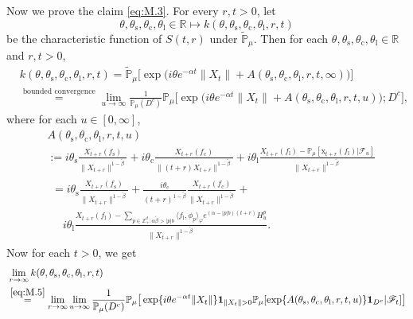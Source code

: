 \documentclass{amse-new}
\numberwithin{equation}{section}
\begin{document}
\begin{prof}
	Now we prove the claim \eqref{eq:M.3}.
	For every $r,t >0$, let
\[
	\theta,\theta_\mathrm s,\theta_\mathrm c,\theta_\mathrm l \in \mathbb R
	\mapsto k(\theta,\theta_\mathrm s,\theta_\mathrm c,\theta_\mathrm l,r,t)
\]
	be the characteristic function of  $S(t,r)$ under $\widetilde{\mathbb P}_{\mu}$.
	Then for each $\theta,\theta_\mathrm s,\theta_\mathrm c,\theta_\mathrm l\in \mathbb R$ and $r,t> 0$,
\begin{align}
	&k(\theta,\theta_\mathrm s,\theta_\mathrm c,\theta_\mathrm l,r,t)
	=\widetilde{\mathbb P}_{\mu}\big[\exp\big( i\theta e^{-\alpha t}\|X_t\|+A(\theta_\mathrm s,\theta_\mathrm c,\theta_\mathrm l,r,t,\infty)\big)\big]\\
	&\label{eq:M.5}\overset{\text{bounded convergence}}=\lim_{u\rightarrow \infty}\frac{1}{\mathbb P_{\mu}(D^c)}\mathbb P_{\mu}\big[\exp\big( i\theta e^{-\alpha t}\|X_t\|+A(\theta_\mathrm s,\theta_\mathrm c,\theta_\mathrm l,r,t,u)\big);D^c\big],
\end{align}
	where for each $u\in [0,\infty]$,
\begin{align}
	&A(\theta_\mathrm s,\theta_\mathrm c,\theta_\mathrm l,r,t,u)
	\\&:=i\theta_\mathrm s \frac{X_{t+r}(f_\mathrm s)}{\|X_{t+r}\|^{1-\tilde{\beta}}} + i\theta_\mathrm c \frac{X_{t+r}(f_\mathrm c)}{\|(t+r)X_{t+r}\|^{1-\tilde{\beta}}} + i\theta_\mathrm l  \frac{ X_{t+r}(f_\mathrm l)- \mathbb P_\mu[\mathrm x_{t+r}(f_\mathrm l)|\mathscr F_u]}{\|X_{t+r}\|^{1-\tilde{\beta}}}
	\\&\label{eq:M.6}
\begin{multlined}
	=i\theta_\mathrm s \frac{X_{t+r}(f_\mathrm s)}{\|X_{t+r}\|^{1-\tilde{\beta}}} + \frac{i\theta_\mathrm c}{(t+r)^{1-\tilde{\beta}}} \frac{X_{t+r}(f_\mathrm c)}{\|X_{t+r}\|^{1-\tilde{\beta}}} + {}
	\\\quad  i\theta_\mathrm l  \frac{ X_{t+r}(f_\mathrm l) - \sum_{p\in \mathbb Z_+^d:\alpha\tilde{\beta}>|p|b}
		\langle f_\mathrm l, \phi_p\rangle_\varphi e^{(\alpha - |p|b)(t+r)} H_u^p
	}{\|X_{t+r}\|^{1-\tilde{\beta}}}.
\end{multlined}
\end{align}
	Now for each $t>0$, we get
\begin{align}
	& \lim_{r\to \infty}k(\theta,\theta_\mathrm s,\theta_\mathrm c,\theta_\mathrm l,r,t)
	\\&\overset{\eqref{eq:M.5}}=\lim_{r\to \infty}\lim_{u\rightarrow \infty}\frac{1}{\mathbb P_{\mu}(D^c)}\mathbb P_{\mu}\big[\exp\{i\theta e^{-\alpha t}\|X_t\|\} \mathbf 1_{\|X_t\|>0} \mathbb P_{\mu}[\exp\{A(\theta_\mathrm s,\theta_\mathrm c,\theta_\mathrm l,r,t,u)\}\mathbf 1_{D^c}|\mathscr F_t]\big]

\end{align}
\end{prof}
\end{document}
